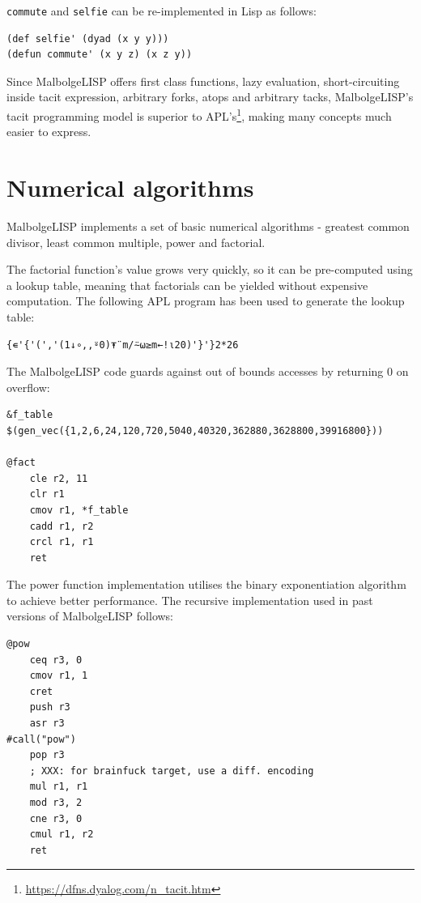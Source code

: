 \par \verb|commute| and \verb|selfie| can be re-implemented in Lisp as follows:
\begin{verbatim}
(def selfie' (dyad (x y y)))
(defun commute' (x y z) (x z y))
\end{verbatim}

\par Since MalbolgeLISP offers first class functions, lazy evaluation, short-circuiting inside tacit expression, arbitrary forks, atops and arbitrary tacks, MalbolgeLISP's tacit programming model is superior to APL's\footnote{\url{https://dfns.dyalog.com/n_tacit.htm}}, making many concepts much easier to express.

\section{Numerical algorithms}

\par MalbolgeLISP implements a set of basic numerical algorithms - greatest common divisor, least common multiple, power and factorial.

\par The factorial function's value grows very quickly, so it can be pre-computed using a lookup table, meaning that factorials can be yielded without expensive computation. The following APL program has been used to generate the lookup table:

\begin{verbatim}
{∊'{'(','(1↓∘,,⍤0)⍕¨m/⍨⍵≥m←!⍳20)'}'}2*26
\end{verbatim}

\par The MalbolgeLISP code guards against out of bounds accesses by returning 0 on overflow:

\begin{verbatim}
&f_table
$(gen_vec({1,2,6,24,120,720,5040,40320,362880,3628800,39916800}))

@fact
    cle r2, 11
    clr r1
    cmov r1, *f_table
    cadd r1, r2
    crcl r1, r1
    ret
\end{verbatim}

\par The power function implementation utilises the binary exponentiation algorithm to achieve better performance. The recursive implementation used in past versions of MalbolgeLISP follows:

\begin{verbatim}
@pow
    ceq r3, 0
    cmov r1, 1
    cret
    push r3
    asr r3
#call("pow")
    pop r3
    ; XXX: for brainfuck target, use a diff. encoding
    mul r1, r1
    mod r3, 2
    cne r3, 0
    cmul r1, r2
    ret
\end{verbatim}


